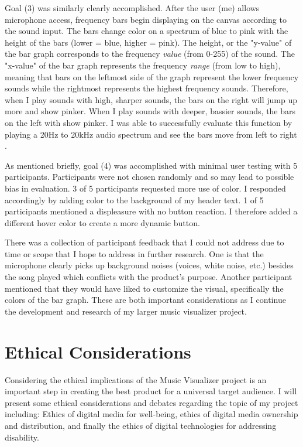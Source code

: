 \documentclass[10pt,twocolumn]{article}
\begin{document}
Goal (3) was similarly clearly accomplished. After the user (me) allows microphone access, frequency bars begin displaying on the canvas according to the sound input. The bars change color on a spectrum of blue to pink with the height of the bars (lower = blue, higher = pink). The height, or the "y-value" of the bar graph corresponds to the frequency \textit{value} (from 0-255) of the sound. The "x-value" of the bar graph represents the frequency \textit{range} (from low to high), meaning that bars on the leftmost side of the graph represent the lower frequency sounds while the rightmost represents the highest frequency sounds. Therefore, when I play sounds with high, sharper sounds, the bars on the right will jump up more and show pinker. When I play sounds with deeper, bassier sounds, the bars on the left with show pinker. I was able to successfully evaluate this function by playing a 20Hz to 20kHz audio spectrum and see the bars move from left to right \cite{adminofthissite}.

As mentioned briefly, goal (4) was accomplished with minimal user testing with 5 participants. Participants were not chosen randomly and so may lead to possible bias in evaluation. 3 of 5 participants requested more use of color. I responded accordingly by adding color to the background of my header text. 1 of 5 participants mentioned a displeasure with no button reaction. I therefore added a different hover color to create a more dynamic button. 

There was a collection of participant feedback that I could not address due to time or scope that I hope to address in further research. One is that the microphone clearly picks up background noises (voices, white noise, etc.) besides the song played which conflicts with the product's purpose. Another participant mentioned that they would have liked to customize the visual, specifically the colors of the bar graph. These are both important considerations as I continue the development and research of my larger music visualizer project. 

\section{Ethical Considerations}
Considering the ethical implications of the Music Visualizer project is an important step in creating the best product for a universal target audience. I will present some ethical considerations and debates regarding the topic of my project including: Ethics of digital media for well-being, ethics of digital media ownership and distribution, and finally the ethics of digital technologies for addressing disability.
\end{document}
